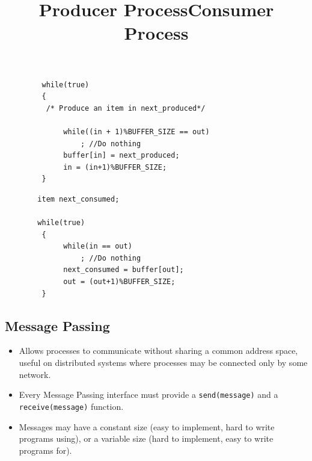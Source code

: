 \documentclass{article}
\theoremstyle{plain}
\theoremstyle{definition}
\begin{document}
\begin{figure}[!h]
 \begin{minipage}{0.5\textwidth}
  \centering
  \begin{verbatim}
   while(true)
   {
    /* Produce an item in next_produced*/
    
        while((in + 1)%BUFFER_SIZE == out)
            ; //Do nothing
        buffer[in] = next_produced;
        in = (in+1)%BUFFER_SIZE;
   }
  \end{verbatim}
  \title{Producer Process}
 \end{minipage}
 \begin{minipage}{0.5\textwidth}
  \centering
  \begin{verbatim}
  item next_consumed;
  
  while(true)
   {
        while(in == out)
            ; //Do nothing
        next_consumed = buffer[out];
        out = (out+1)%BUFFER_SIZE;
   }
  \end{verbatim}
  \title{Consumer Process}
 \end{minipage}
\end{figure}

\subsection{Message Passing}
\begin{itemize}
    \item Allows processes to communicate without sharing a common address space, useful on distributed systems where processes may be connected only by some network. 
    
    \item Every Message Passing interface must provide a \texttt{send(message)} and a \texttt{receive(message)} function. 
    
    \item Messages may have a constant size (easy to implement, hard to write programs using), or a variable size (hard to implement, easy to write programs for). 
\end{itemize}
\end{document}
